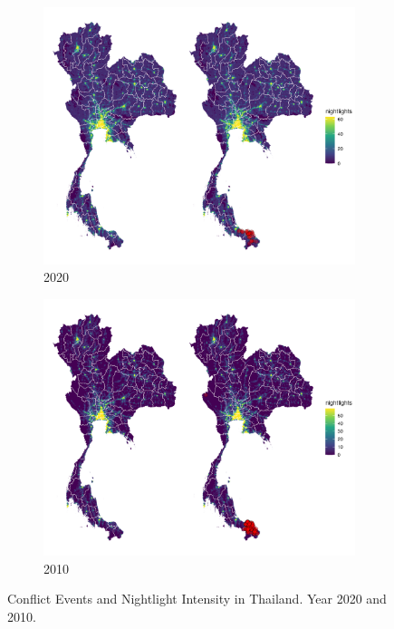 \documentclass[11pt]{article}
\begin{document}
\begin{figure}[ht]
     \centering
     \begin{subfigure}[b]{0.45\textwidth}
         \centering
         \includegraphics[width=\textwidth]{map_thailand_2020.png}
         \caption{2020}
         \label{fig:thailand2020}
     \end{subfigure}
    \begin{subfigure}[b]{0.45\textwidth}
         \centering
         \includegraphics[width=\textwidth]{map_thailand_2010.png}
         \caption{2010}
         \label{fig:thailand2010}
    \end{subfigure}
    \caption{Conflict Events and Nightlight Intensity in Thailand. Year 2020 and 2010.}
    \label{fig:thailandmap}
\end{figure}
\end{document}
